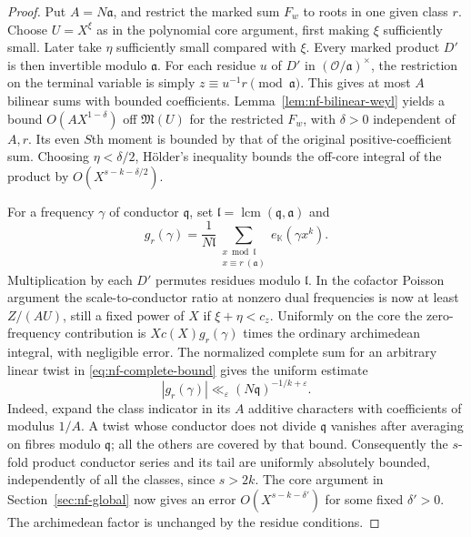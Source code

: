\documentclass[11pt,letterpaper]{article}
\theoremstyle{definition}
\numberwithin{equation}{section}
\begin{document}
\begin{proof}
Put $A=N\mathfrak a$, and restrict the marked sum $F_w$ to roots
in one given class $r$. Choose $U=X^\xi$ as in the polynomial core
argument, first making $\xi$ sufficiently small. Later take $\eta$
sufficiently small compared with $\xi$. Every marked product $D'$
is then invertible modulo $\mathfrak a$. For each residue $u$ of
$D'$ in $(\mathcal O/\mathfrak a)^\times$, the restriction on
the terminal variable is simply $z\equiv u^{-1}r\pmod{\mathfrak a}$.
This gives at most $A$ bilinear sums with bounded coefficients.
Lemma~\ref{lem:nf-bilinear-weyl} yields a bound
$O(AX^{1-\delta})$ off $\mathfrak M(U)$ for the restricted $F_w$,
with $\delta>0$ independent of $A,r$. Its even $S$th moment is
bounded by that of the original positive-coefficient sum. Choosing
$\eta<\delta/2$, H\"older's inequality bounds the off-core integral
of the product by $O(X^{s-k-\delta/2})$.

For a frequency $\gamma$ of conductor $\mathfrak q$, set
$\mathfrak l=\operatorname{lcm}(\mathfrak q,\mathfrak a)$ and
\[
 g_r(\gamma)=\frac{1}{N\mathfrak l}
   \sum_{\substack{x\bmod\mathfrak l\\x\equiv r\ (\mathfrak a)}}
                            e_{\mathbb K}(\gamma x^k).
\]
Multiplication by each $D'$ permutes residues modulo $\mathfrak l$.
In the cofactor Poisson argument the scale-to-conductor ratio at
nonzero dual frequencies is now at least $Z/(A U)$, still a fixed
power of $X$ if $\xi+\eta<c_z$. Uniformly on the core the
zero-frequency contribution is $Xc(X)g_r(\gamma)$ times the
ordinary archimedean integral, with negligible error. The normalized
complete sum for an arbitrary linear twist in
\eqref{eq:nf-complete-bound} gives the uniform estimate
\[
 |g_r(\gamma)|\ll_\varepsilon
                  (N\mathfrak q)^{-1/k+\varepsilon}.
\]
Indeed, expand the class indicator in its $A$ additive characters
with coefficients of modulus $1/A$. A twist whose conductor does
not divide $\mathfrak q$ vanishes after averaging on fibres
modulo $\mathfrak q$; all the others are covered by that bound.
Consequently the $s$-fold product conductor series and its tail
are uniformly absolutely bounded, independently of all the classes,
since $s>2k$. The core argument in Section~\ref{sec:nf-global}
now gives an error $O(X^{s-k-\delta'})$ for some fixed $\delta'>0$.
The archimedean factor is unchanged by the residue conditions.


\end{proof}
\end{document}
